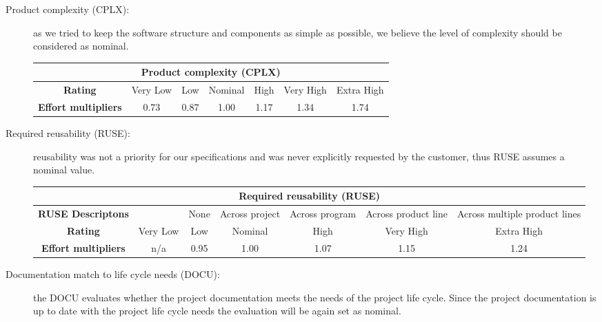 \begin{description}
\item[Product complexity (CPLX):] as we tried to keep the software structure and components as simple as possible, we believe the level of complexity should be considered as nominal.

\begin{tabular}{ | c | c | c | c | c | c | c | }
\hline
         \multicolumn{7}{|c|}{\textbf{Product complexity (CPLX)}} \\ \hline  \hline
	\textbf{Rating}&Very Low & Low & Nominal  & High & Very High &Extra High\\ \hline
	\textbf{Effort multipliers} & 0.73 & 0.87 & 1.00 & 1.17 & 1.34 &  1.74 \\ \hline
\end{tabular}

\item[Required reusability (RUSE):] reusability was not a priority for our specifications and was never explicitly requested by the customer, thus RUSE assumes a nominal value.

\begin{tabular}{ | c | c | c | c | c | c | c | }
\hline
         \multicolumn{7}{|c|}{\textbf{Required reusability (RUSE)}} \\ \hline  \hline
         	\textbf{RUSE Descriptons} & & None & Across project & Across program& Across product line &Across multiple product lines \\ \hline
	\textbf{Rating}&Very Low & Low & Nominal  & High & Very High &Extra High\\ \hline
	\textbf{Effort multipliers} & n/a & 0.95 & 1.00 & 1.07 & 1.15 &  1.24 \\ \hline
\end{tabular}

\item[Documentation match to life cycle needs (DOCU):] the DOCU evaluates whether the project documentation meets the needs of the project life cycle. Since the project documentation is up to date with the project life cycle needs the evaluation will be again set as nominal.


\end{description}
